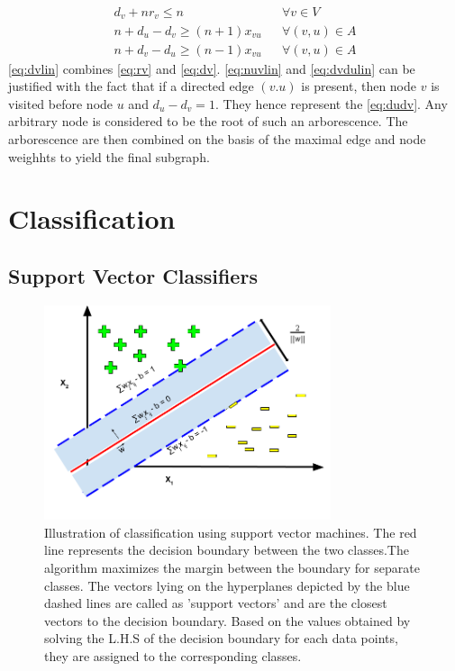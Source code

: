 \documentclass[msthesis.tex]{subfiles}
\begin{document}
\begin{align}
    \label{eq:dvlin}
    d_v + n r_v \leq n && \forall v \in V\\
    \label{eq:nuvlin}
    n + d_u - d_v \geq (n+1) x_{vu} && \forall (v,u) \in A\\
    \label{eq:dvdulin}
    n + d_v - d_u \geq (n-1) x_{vu} && \forall (v,u) \in A
\end{align}
\autoref{eq:dvlin} combines \autoref{eq:rv} and \autoref{eq:dv}. \autoref{eq:nuvlin} and \autoref{eq:dvdulin} can be justified with the fact that if a directed edge $(v.u)$ is present, then node $v$ is visited before node $u$ and $d_u - d_v = 1$. They hence represent the \autoref{eq:dudv}.
Any arbitrary node is considered to be the root of such an arborescence. The arborescence are then combined on the basis of the maximal edge and node weighhts to yield the final subgraph. 

\section{Classification}
\subsection{Support Vector Classifiers}
\begin{figure}
    \label{fig:svm}
    \centering
    \includegraphics[width=0.75\textwidth]{images/SVM.png}
    \caption{Illustration of classification using support vector machines. The red line represents the decision boundary between the two classes.The algorithm maximizes the margin between the boundary for separate classes. The vectors lying on the hyperplanes depicted by the blue dashed lines are called as 'support vectors' and are the closest vectors to the decision boundary. Based on the values obtained by solving the L.H.S of the decision boundary for each data points, they are assigned to the corresponding classes.}
    \label{fig:my_label}
\end{figure}
\end{document}
